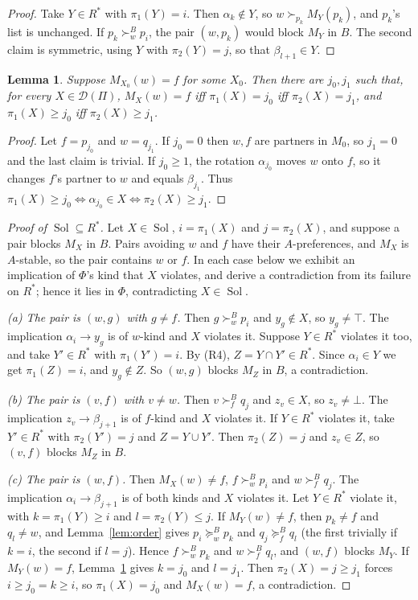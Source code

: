 \documentclass[11pt]{article}
\newtheorem{lemma}[theorem]{Lemma}
\theoremstyle{definition}
\theoremstyle{remark}
\newcommand{\D}{\mathcal D}
\newcommand{\Sol}{\operatorname{Sol}}
\begin{document}
\begin{proof}
Take $Y\in R^*$ with $\pi_1(Y)=i$. Then $\alpha_k\notin Y$, so $w\succ_{p_k}M_Y(p_k)$, and $p_k$'s list is unchanged. If $p_k\succ^B_w p_i$, the pair $(w,p_k)$ would block $M_Y$ in $B$. The second claim is symmetric, using $Y$ with $\pi_2(Y)=j$, so that $\beta_{l+1}\in Y$.
\end{proof}

\begin{lemma}\label{lem:couple}
Suppose $M_{X_0}(w)=f$ for some $X_0$. Then there are $j_0,j_1$ such that, for every $X\in\D(\Pi)$, $M_X(w)=f$ iff $\pi_1(X)=j_0$ iff $\pi_2(X)=j_1$, and $\pi_1(X)\ge j_0$ iff $\pi_2(X)\ge j_1$.
\end{lemma}

\begin{proof}
Let $f=p_{j_0}$ and $w=q_{j_1}$. If $j_0=0$ then $w,f$ are partners in $M_0$, so $j_1=0$ and the last claim is trivial. If $j_0\ge1$, the rotation $\alpha_{j_0}$ moves $w$ onto $f$, so it changes $f$'s partner to $w$ and equals $\beta_{j_1}$. Thus $\pi_1(X)\ge j_0\iff\alpha_{j_0}\in X\iff\pi_2(X)\ge j_1$.
\end{proof}

\begin{proof}[Proof of $\Sol\subseteq R^*$]
Let $X\in\Sol$, $i=\pi_1(X)$ and $j=\pi_2(X)$, and suppose a pair blocks $M_X$ in $B$. Pairs avoiding $w$ and $f$ have their $A$-preferences, and $M_X$ is $A$-stable, so the pair contains $w$ or $f$. In each case below we exhibit an implication of $\Phi$'s kind that $X$ violates, and derive a contradiction from its failure on $R^*$; hence it lies in $\Phi$, contradicting $X\in\Sol$.

\emph{(a) The pair is $(w,g)$ with $g\ne f$.} Then $g\succ^B_w p_i$ and $y_g\notin X$, so $y_g\ne\top$. The implication $\alpha_i\to y_g$ is of $w$-kind and $X$ violates it. Suppose $Y\in R^*$ violates it too, and take $Y'\in R^*$ with $\pi_1(Y')=i$. By (R4), $Z=Y\cap Y'\in R^*$. Since $\alpha_i\in Y$ we get $\pi_1(Z)=i$, and $y_g\notin Z$. So $(w,g)$ blocks $M_Z$ in $B$, a contradiction.

\emph{(b) The pair is $(v,f)$ with $v\ne w$.} Then $v\succ^B_f q_j$ and $z_v\in X$, so $z_v\ne\bot$. The implication $z_v\to\beta_{j+1}$ is of $f$-kind and $X$ violates it. If $Y\in R^*$ violates it, take $Y'\in R^*$ with $\pi_2(Y')=j$ and $Z=Y\cup Y'$. Then $\pi_2(Z)=j$ and $z_v\in Z$, so $(v,f)$ blocks $M_Z$ in $B$.

\emph{(c) The pair is $(w,f)$.} Then $M_X(w)\ne f$, $f\succ^B_w p_i$ and $w\succ^B_f q_j$. The implication $\alpha_i\to\beta_{j+1}$ is of both kinds and $X$ violates it. Let $Y\in R^*$ violate it, with $k=\pi_1(Y)\ge i$ and $l=\pi_2(Y)\le j$. If $M_Y(w)\ne f$, then $p_k\ne f$ and $q_l\ne w$, and Lemma~\ref{lem:order} gives $p_i\succeq^B_w p_k$ and $q_j\succeq^B_f q_l$ (the first trivially if $k=i$, the second if $l=j$). Hence $f\succ^B_w p_k$ and $w\succ^B_f q_l$, and $(w,f)$ blocks $M_Y$. If $M_Y(w)=f$, Lemma~\ref{lem:couple} gives $k=j_0$ and $l=j_1$. Then $\pi_2(X)=j\ge j_1$ forces $i\ge j_0=k\ge i$, so $\pi_1(X)=j_0$ and $M_X(w)=f$, a contradiction.
\end{proof}
\end{document}
